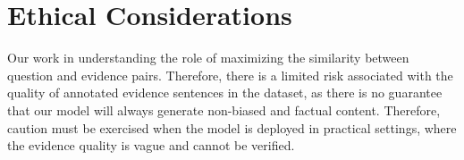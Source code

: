 \section*{Ethical Considerations}
Our work in understanding the role of maximizing the similarity between question and evidence pairs. Therefore, there is a limited risk associated with the quality of annotated evidence sentences in the dataset, as there is no guarantee that our model will always
generate non-biased and factual content. Therefore, caution must
be exercised when the model is deployed in practical settings, where the evidence quality is vague and cannot be verified.